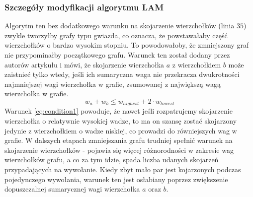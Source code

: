 \subsubsection{Szczegóły modyfikacji algorytmu LAM}
Algorytm ten bez dodatkowego warunku na skojarzenie wierzchołków (linia $35$) zwykle tworzyłby grafy typu gwiazda, co oznacza,
że powstawałaby część wierzchołków o bardzo wysokim stopniu.
To powodowałoby, że zmniejszony graf nie przypominałby początkowego grafu.
Warunek ten został dodany przez autorów artykułu \cite{weighted_maching} i mówi, że
skojarzenie wierzchołka $a$ z wierzchołkiem $b$ może zaistnieć tylko wtedy, jeśli ich sumaryczna
waga nie przekracza dwukrotności najmniejszej wagi wierzchołka w grafie,
zsumowanej z największą wagą wierzchołka w grafie.
\begin{equation}
w_{a} + w_{b} \leq w_{highest} + 2 \cdot w_{lowest}
\label{eq:condition1}
\end{equation}
Warunek \ref{eq:condition1} powoduje, że nawet jeśli rozpatrujemy skojarzenie wierzchołka o relatywnie wysokiej wadze, to ma on szansę
zostać skojarzony jedynie z wierzchołkiem o wadze niskiej, co prowadzi do równiejszych wag w grafie.
W dalszych etapach zmniejszania grafu trudniej spełnić
warunek na skojarzenie wierzchołków - pojawia się więcej różnorodności w zakresie wag wierzchołków grafu, a co za tym idzie,
spada liczba udanych skojarzeń przypadających na wywołanie.
Kiedy zbyt mało par jest kojarzonych podczas pojedynczego wywołania, warunek ten jest osłabiany poprzez
zwiększenie dopuszczalnej sumarycznej wagi wierzchołka $a$ oraz $b$.

